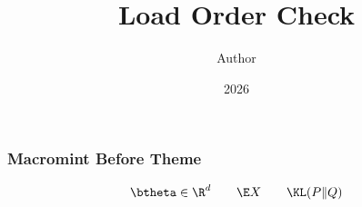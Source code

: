 \documentclass[notheorems,aspectratio=169]{beamer}
\title{Load Order Check}
\author{Author}
\date{2026}
\begin{document}
\maketitle

\begin{frame}
  \frametitle{Macromint Before Theme}

  \[
    \btheta \in \R^d
    \qquad
    \E X
    \qquad
    \KL(P \Vert Q)
  \]
\end{frame}
\end{document}
